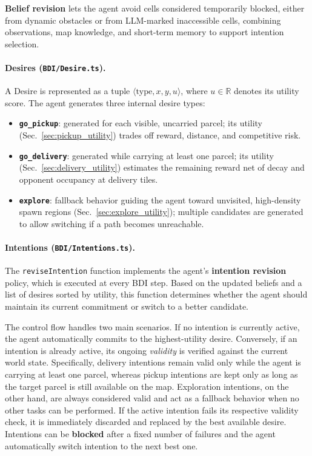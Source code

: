 \textbf{Belief revision} lets the agent avoid cells considered temporarily blocked, either from dynamic obstacles or from LLM-marked inaccessible cells, combining observations, map knowledge, and short-term memory to support intention selection.

\paragraph{Desires (\texttt{BDI/Desire.ts}).} 
A Desire is represented as a tuple $\langle \text{type}, x, y, u \rangle$, where $u \in \mathbb{R}$ denotes its utility score. The agent generates three internal desire types:

\begin{itemize}
    \item \textbf{\texttt{go\_pickup}}: generated for each visible, uncarried parcel; its utility (Sec.~\ref{sec:pickup_utility}) trades off reward, distance, and competitive risk.
    
    \item \textbf{\texttt{go\_delivery}}: generated while carrying at least one parcel; its utility (Sec.~\ref{sec:delivery_utility}) estimates the remaining reward net of decay and opponent occupancy at delivery tiles.
    
    \item \textbf{\texttt{explore}}: fallback behavior guiding the agent toward unvisited, high-density spawn regions (Sec.~\ref{sec:explore_utility}); multiple candidates are generated to allow switching if a path becomes unreachable.
\end{itemize}

\paragraph{Intentions (\texttt{BDI/Intentions.ts}).} 
The \texttt{reviseIntention} function implements the agent's \textbf{intention revision} policy, which is executed at every BDI step. Based on the updated beliefs and a list of desires sorted by utility, this function determines whether the agent should maintain its current commitment or switch to a better candidate.

The control flow handles two main scenarios. If no intention is currently active, the agent automatically commits to the highest-utility desire. Conversely, if an intention is already active, its ongoing \textit{validity} is verified against the current world state. Specifically, delivery intentions remain valid only while the agent is carrying at least one parcel, whereas pickup intentions are kept only as long as the target parcel is still available on the map. Exploration intentions, on the other hand, are always considered valid and act as a fallback behavior when no other tasks can be performed. If the active intention fails its respective validity check, it is immediately discarded and replaced by the best available desire. Intentions can be \textbf{blocked} after a fixed number of failures and the agent automatically switch intention to the next best one. 

